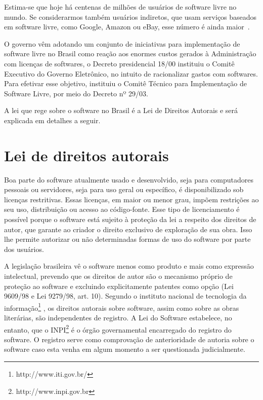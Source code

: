 Estima-se que hoje há centenas de milhões de usuários de software livre no mundo. Se
considerarmos também usuários indiretos, que usam serviços baseados em software livre,
como Google, Amazon ou eBay, esse número é ainda maior~\cite{sabino2009licenccas}.



O governo vêm adotando um conjunto de iniciativas para implementação de software
livre no Brasil como reação aos enormes custos gerados à Administração com licenças
de softwares, o Decreto presidencial 18/00 instituiu o Comitê Executivo do Governo
Eletrônico, no intuito de racionalizar gastos com softwares. Para efetivar esse 
objetivo, instituiu o Comitê Técnico para Implementação de Software Livre, por
meio do Decreto nº 29/03. 

A lei que rege sobre o software no Brasil é a Lei de Direitos Autorais e será 
explicada em detalhes a seguir. 

\section{Lei de direitos autorais}

Boa parte do software atualmente usado e desenvolvido, seja para computadores 
pessoais ou servidores, seja para uso geral ou específico, é disponibilizado sob
licenças restritivas. Essas licenças, em maior ou menor grau, impõem restrições 
ao seu uso, distribuição ou acesso ao código-fonte. Esse tipo de licenciamento é 
possível porque o software está sujeito à proteção da lei a respeito dos direitos 
de autor, que garante ao criador o direito exclusivo de exploração de sua obra. 
Isso lhe permite autorizar ou não determinadas formas de uso do software por parte 
dos usuários.%

A legislação brasileira vê o software menos como produto e mais como expressão 
intelectual, prevendo que os direitos de autor são o mecanismo próprio de proteção 
ao software e excluindo explicitamente patentes como opção (Lei 9609/98 e Lei 9279/98, art. 10).
%
Segundo o instituto nacional de tecnologia da informação\footnote{http://www.iti.gov.br/}
, os direitos autorais sobre software, assim como sobre as obras literárias, são 
independentes de registro. A Lei do Software estabelece, no entanto, que o INPI\footnote{http://www.inpi.gov.br}
é o órgão governamental encarregado do registro do software. O registro serve 
como comprovação de anterioridade de autoria sobre o software caso esta venha 
em algum momento a ser questionada judicialmente.

